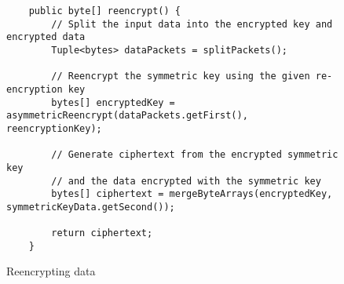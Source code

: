 \begin{figure}[H]
  \centering
  \begin{verbatim}
	public byte[] reencrypt() {
		// Split the input data into the encrypted key and encrypted data
		Tuple<bytes> dataPackets = splitPackets();

		// Reencrypt the symmetric key using the given re-encryption key
		bytes[] encryptedKey = asymmetricReencrypt(dataPackets.getFirst(), reencryptionKey);

		// Generate ciphertext from the encrypted symmetric key
		// and the data encrypted with the symmetric key
		bytes[] ciphertext = mergeByteArrays(encryptedKey, symmetricKeyData.getSecond());
        
		return ciphertext;
	}
  \end{verbatim}
  \caption{Reencrypting data}
  \label{code:reencrypt_data}
\end{figure}
